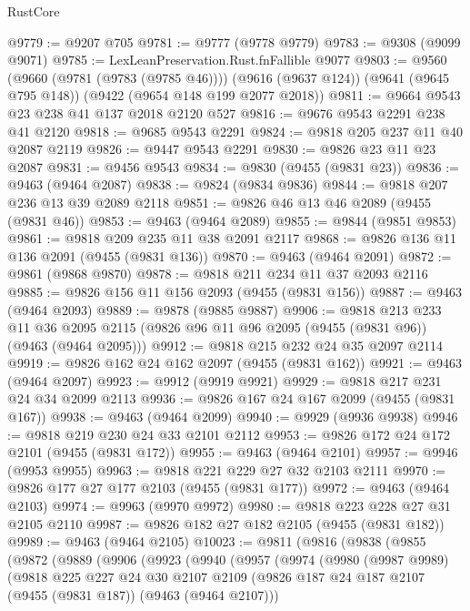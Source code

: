 \begin{lexlean}{RustCore}
\begin{coremodule}
@9779 := @9207 @705
@9781 := @9777 (@9778 @9779)
@9783 := @9308 (@9099 @9071)
@9785 := LexLeanPreservation.Rust.fnFallible @9077
@9803 := @9560
    (@9660 (@9781 (@9783 (@9785 @46))))
    (@9616 (@9637 @124))
    (@9641 (@9645 @795 @148))
    (@9422 (@9654 @148 @199 @2077 @2018))
@9811 := @9664 @9543 @23 @238 @41 @137 @2018 @2120 @527
@9816 := @9676 @9543 @2291 @238 @41 @2120
@9818 := @9685 @9543 @2291
@9824 := @9818 @205 @237 @11 @40 @2087 @2119
@9826 := @9447 @9543 @2291
@9830 := @9826 @23 @11 @23 @2087
@9831 := @9456 @9543
@9834 := @9830 (@9455 (@9831 @23))
@9836 := @9463 (@9464 @2087)
@9838 := @9824 (@9834 @9836)
@9844 := @9818 @207 @236 @13 @39 @2089 @2118
@9851 := @9826 @46 @13 @46 @2089 (@9455 (@9831 @46))
@9853 := @9463 (@9464 @2089)
@9855 := @9844 (@9851 @9853)
@9861 := @9818 @209 @235 @11 @38 @2091 @2117
@9868 := @9826 @136 @11 @136 @2091 (@9455 (@9831 @136))
@9870 := @9463 (@9464 @2091)
@9872 := @9861 (@9868 @9870)
@9878 := @9818 @211 @234 @11 @37 @2093 @2116
@9885 := @9826 @156 @11 @156 @2093 (@9455 (@9831 @156))
@9887 := @9463 (@9464 @2093)
@9889 := @9878 (@9885 @9887)
@9906 := @9818
    @213
    @233
    @11
    @36
    @2095
    @2115
    (@9826 @96 @11 @96 @2095 (@9455 (@9831 @96)) (@9463 (@9464 @2095)))
@9912 := @9818 @215 @232 @24 @35 @2097 @2114
@9919 := @9826 @162 @24 @162 @2097 (@9455 (@9831 @162))
@9921 := @9463 (@9464 @2097)
@9923 := @9912 (@9919 @9921)
@9929 := @9818 @217 @231 @24 @34 @2099 @2113
@9936 := @9826 @167 @24 @167 @2099 (@9455 (@9831 @167))
@9938 := @9463 (@9464 @2099)
@9940 := @9929 (@9936 @9938)
@9946 := @9818 @219 @230 @24 @33 @2101 @2112
@9953 := @9826 @172 @24 @172 @2101 (@9455 (@9831 @172))
@9955 := @9463 (@9464 @2101)
@9957 := @9946 (@9953 @9955)
@9963 := @9818 @221 @229 @27 @32 @2103 @2111
@9970 := @9826 @177 @27 @177 @2103 (@9455 (@9831 @177))
@9972 := @9463 (@9464 @2103)
@9974 := @9963 (@9970 @9972)
@9980 := @9818 @223 @228 @27 @31 @2105 @2110
@9987 := @9826 @182 @27 @182 @2105 (@9455 (@9831 @182))
@9989 := @9463 (@9464 @2105)
@10023 := @9811
    (@9816
      (@9838
        (@9855
          (@9872
            (@9889
              (@9906
                (@9923
                  (@9940
                    (@9957
                      (@9974
                        (@9980
                          (@9987 @9989)
                          (@9818
                            @225
                            @227
                            @24
                            @30
                            @2107
                            @2109
                            (@9826 @187 @24 @187 @2107 (@9455 (@9831 @187)) (@9463 (@9464 @2107)))

\end{coremodule}
\end{lexlean}
